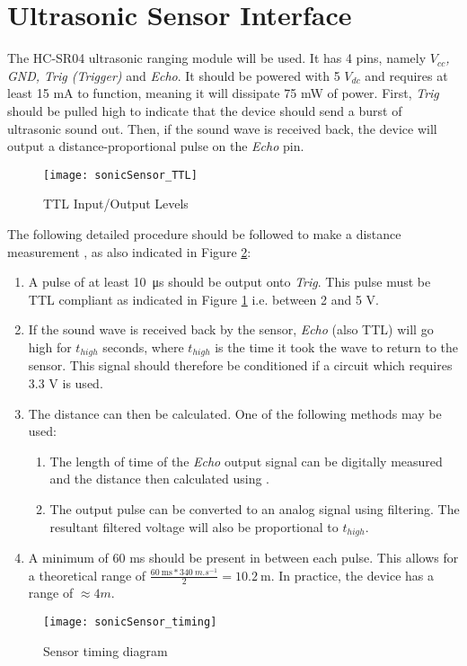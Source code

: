 \graphicspath{{content/1_literatureReview/figures/}}
\section{Ultrasonic Sensor Interface}\label{sec:ultrasonicSensorInterface}

The HC-SR04 ultrasonic ranging module will be used. It has 4 pins, namely \textit{$V_{cc}$, GND, Trig (Trigger)} and \textit{Echo}.
It should be powered with 5 ${V_{dc}}$ and requires at least 15 mA to function, meaning it will dissipate 75 mW of power. 
First, \textit{Trig} should be pulled high to indicate that the device should send a burst of ultrasonic sound out.
Then, if the sound wave is received back, the device will output a distance-proportional pulse on the \textit{Echo} pin.

\begin{figure}[!htb]
  \centering
  \texttt{[image: sonicSensor\_TTL]}
  \caption{TTL Input/Output Levels \cite{ttlLevels}}
  \label{fig:sonicSensor_TTL}
\end{figure}

The following detailed procedure should be followed to make a distance measurement \cite{datasheetHCSR04}, as also indicated in Figure \ref{fig:sonicSensor_timing}:
\begin{enumerate}
    \item A pulse of at least \SI{10}{\micro\second} should be output onto \textit{Trig}. This pulse must be TTL compliant as indicated
    in Figure \ref{fig:sonicSensor_TTL} i.e. between 2 and 5 V.
    \item If the sound wave is received back by the sensor, \textit{Echo} (also TTL) will go high for ${t_{high}}$ seconds, where ${t_{high}}$ is the time it took the wave to return to the sensor.
          This signal should therefore be conditioned if a circuit which requires 3.3 V is used.
    \item The distance can then be calculated. One of the following methods may be used:
    \begin{enumerate}
        \item The length of time of the \textit{Echo} output signal can be digitally measured and the distance then calculated using  \cite{datasheetHCSR04}.
        \item The output pulse can be converted to an analog signal using filtering. The resultant filtered voltage will also be proportional to $t_{high}$.
    \end{enumerate}
    \item A minimum of 60 ms should be present in between each pulse. This allows for a theoretical range of $\frac{\SI{60}{\milli\second} * \SI{340}{m.s^{-1}}}{2} = \SI{10.2}{\metre}$.
          In practice, the device has a range of $\approx 4 m$.
\end{enumerate}

\begin{figure}[!htb]
  \centering
  \texttt{[image: sonicSensor\_timing]}
  \caption{Sensor timing diagram \cite{datasheetHCSR04}}
  \label{fig:sonicSensor_timing}
\end{figure}